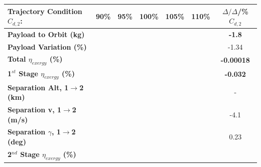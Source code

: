 \begin{table}[ht]%
	\centering
	\begin{tabular}{l c c c c c c} 
		\hline \textbf{Trajectory Condition}   \qquad  $C_{d,2}$:
		&90\%
		&95\%
		&100\%
		&105\%
		&110\%
		& $\Delta/\Delta$/\%$C_{d,2}$
		\\
		\hline \textbf{Payload to Orbit (kg)}
		& \textbf{\PayloadToOrbitCdNinety}
		& \textbf{\PayloadToOrbitCdNinetyFive}
		& \textbf{\PayloadToOrbitCdStandard}
		& \textbf{\PayloadToOrbitCdOneHundredFive}
		& \textbf{\PayloadToOrbitCdOneHundredTen}
		&\textbf{-1.8}
		\\
		\textbf{Payload Variation (\%)}
		& \PayloadVarCdNinety
		& \PayloadVarCdNinetyFive
		& \PayloadVarCdStandard
		& \PayloadVarCdOneHundredFive
		& \PayloadVarCdOneHundredTen
		&-1.34
		\\
		\textbf{Total $\eta_{exergy}$ (\%)}
		& \textbf{\totalExergyEffCdNinety}
		& \textbf{\totalExergyEffCdNinetyFive}
		& \textbf{\totalExergyEffCdStandard}
		& \textbf{\totalExergyEffCdOneHundredFive}
		& \textbf{\totalExergyEffCdOneHundredTen}
		& \textbf{-0.00018}
		\\
		\hline 
		\textbf{1$^{st}$ Stage $\eta_{exergy}$ (\%)}
		& \textbf{\firstExergyEffCdNinety}
		& \textbf{\firstExergyEffCdNinetyFive}
		& \textbf{\firstExergyEffCdStandard}
		& \textbf{\firstExergyEffCdOneHundredFive}
		& \textbf{\firstExergyEffCdOneHundredTen}
		& \textbf{-0.032}
		\\
		\textbf{Separation Alt, 1$\rightarrow$2 (km)}
		& \firstsecondSeparationAltCdNinety
		& \firstsecondSeparationAltCdNinetyFive
		& \firstsecondSeparationAltCdStandard
		& \firstsecondSeparationAltCdOneHundredFive
		& \firstsecondSeparationAltCdOneHundredTen
		& -
		\\
		\textbf{Separation v, 1$\rightarrow$2 (m/s)}
		& \firstsecondSeparationvCdNinety
		& \firstsecondSeparationvCdNinetyFive
		& \firstsecondSeparationvCdStandard
		& \firstsecondSeparationvCdOneHundredFive
		& \firstsecondSeparationvCdOneHundredTen
		&-4.1
		\\
		\textbf{Separation $\gamma$, 1$\rightarrow$2 (deg)}
		& \firstsecondSeparationgammaCdNinety
		& \firstsecondSeparationgammaCdNinetyFive
		& \firstsecondSeparationgammaCdStandard
		& \firstsecondSeparationgammaCdOneHundredFive
		& \firstsecondSeparationgammaCdOneHundredTen
		&0.23
		\\
		\hline 
		\textbf{2$^{nd}$ Stage $\eta_{exergy}$ (\%)}
		& \textbf{\secondExergyEffCdNinety}
		& \textbf{\secondExergyEffCdNinetyFive}
		& \textbf{\secondExergyEffCdStandard}

\end{tabular}
\end{table}
